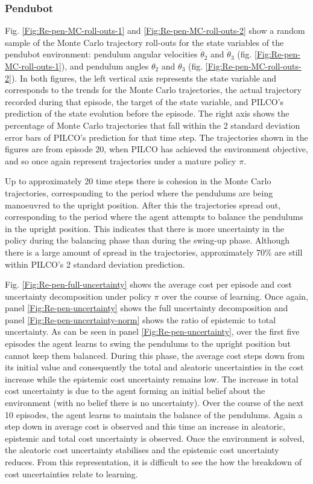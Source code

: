 \subsubsection{Pendubot}
Fig. \ref{Fig:Re-pen-MC-roll-outs-1} and \ref{Fig:Re-pen-MC-roll-outs-2} show a random sample of the Monte Carlo trajectory roll-outs for the state variables of the pendubot environment: pendulum angular velocities $\dot{\theta}_{2}$ and $\dot{\theta}_{3}$ (fig. \ref{Fig:Re-pen-MC-roll-outs-1}), and pendulum angles $\theta_{2}$ and $\theta_{3}$ (fig. \ref{Fig:Re-pen-MC-roll-outs-2}). In both figures, the left vertical axis represents the state variable and corresponds to the trends for the Monte Carlo trajectories, the actual trajectory recorded during that episode, the target of the state variable, and PILCO's prediction of the state evolution before the episode. The right axis shows the percentage of Monte Carlo trajectories that fall within the 2 standard deviation error bars of PILCO's prediction for that time step. The trajectories shown in the figures are from episode 20, when PILCO has achieved the environment objective, and so once again represent trajectories under a mature policy $\pi$. 

Up to approximately 20 time steps there is cohesion in the Monte Carlo trajectories, corresponding to the period where the pendulums are being manoeuvred to the upright position. After this the trajectories spread out, corresponding to the period where the agent attempts to balance the pendulums in the upright position. This indicates that there is more uncertainty in the policy during the balancing phase than during the swing-up phase. Although there is a large amount of spread in the trajectories, approximately $70\%$ are still within PILCO's 2 standard deviation prediction. 

Fig. \ref{Fig:Re-pen-full-uncertainty} shows the average cost per episode and cost uncertainty decomposition under policy $\pi$ over the course of learning. Once again, panel \ref{Fig:Re-pen-uncertainty} shows the full uncertainty decomposition and panel \ref{Fig:Re-pen-uncertainty-norm} shows the ratio of epistemic to total uncertainty. As can be seen in panel \ref{Fig:Re-pen-uncertainty}, over the first five episodes the agent learns to swing the pendulums to the upright position but cannot keep them balanced. During this phase, the average cost steps down from its initial value and consequently the total and aleatoric uncertainties in the cost increase while the epistemic cost uncertainty remains low. The increase in total cost uncertainty is due to the agent forming an initial belief about the environment (with no belief there is no uncertainty). Over the course of the next 10 episodes, the agent learns to maintain the balance of the pendulums. Again a step down in average cost is observed and this time an increase in aleatoric, epistemic and total cost uncertainty is observed. Once the environment is solved, the aleatoric cost uncertainty stabilises and the epistemic cost uncertainty reduces. From this representation, it is difficult to see the how the breakdown of cost uncertainties relate to learning. 

